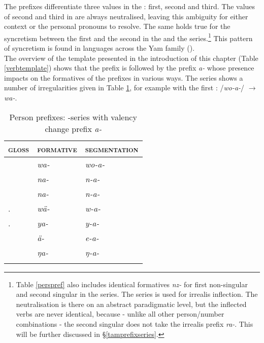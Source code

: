 The prefixes differentiate three  values in the : first, second and third. The values of second and third  in  are always neutralised, leaving this ambiguity for either context or the personal pronouns to resolve. The same holds true for the syncretism between the first  and the second  in the \Alph{} and the \Gam{} series.\footnote{Table \ref{perspref} also includes identical formatives \emph{nz-} for first non-singular and second singular in the \Bet{} series. The \Bet{} series is used for irrealis inflection. The neutralisation is there on an abstract paradigmatic level, but the inflected verbs are never identical, because - unlike all other person/number combinations - the second singular does not take the irrealis prefix \emph{ra-}. This will be further discussed in \S{}\ref{tamprefixseries}.} This pattern of syncretism is found in languages across the Yam family (\citealt{Evans:sng}).\\

The overview of the  template presented in the introduction of this chapter (Table \ref{verbtemplate}) shows that the  prefix is followed by the  prefix \emph{a-} whose presence impacts on the formatives of the  prefixes in various ways. The \Alph{} series shows a number of irregularities given in Table \ref{persprefwithvalencychange}, for example with the first : /\emph{wo-a-}/ $\rightarrow$ \emph{wa-}.

\begin{table}[H]
\caption{Person prefixes: \Alph-series with valency change prefix \emph{a-}}
\label{persprefwithvalencychange}
	\begin{tabular}{lll}
		\lsptoprule
		\textsc{gloss} &\textsc{formative} &\textsc{segmentation}\\\hline
		\Fsg &\emph{wa-} &\emph{wo-a-}\\
		\Fnsg &\emph{na-} &\emph{n-a-}\\
		\Ssg &\emph{na-} &\emph{n-a-}\\
		\Tsg.\F	&\emph{wä-} &\emph{w-a-}\\
		\Tsg.\Masc &\emph{ya-} &\emph{y-a-}\\
		\Stnsg &\emph{ä-} &\emph{e-a-}\footnotemark\\
		\M &\emph{ŋa-} &\emph{ŋ-a-}\\
		\lspbottomrule
	\end{tabular}
\end{table}%

